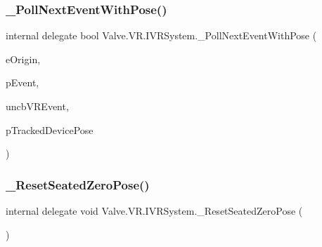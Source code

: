 \mbox{\label{struct_valve_1_1_v_r_1_1_i_v_r_system_a651836066c8780d5e5aadab482bd22d3}} 
\subsubsection{\texorpdfstring{\_PollNextEventWithPose()}{\_PollNextEventWithPose()}}
{\footnotesize\ttfamily internal delegate bool Valve.\+V\+R.\+I\+V\+R\+System.\+\_\+\+Poll\+Next\+Event\+With\+Pose (\begin{DoxyParamCaption}\item[{\mbox{\hyperlink{namespace_valve_1_1_v_r_a29be99a3c2f780157bd490db06a7f12f}{E\+Tracking\+Universe\+Origin}}}]{e\+Origin,  }\item[{ref \mbox{\hyperlink{struct_valve_1_1_v_r_1_1_v_r_event__t}{V\+R\+Event\+\_\+t}}}]{p\+Event,  }\item[{uint}]{uncb\+V\+R\+Event,  }\item[{ref \mbox{\hyperlink{struct_valve_1_1_v_r_1_1_tracked_device_pose__t}{Tracked\+Device\+Pose\+\_\+t}}}]{p\+Tracked\+Device\+Pose }\end{DoxyParamCaption})}

\mbox{\label{struct_valve_1_1_v_r_1_1_i_v_r_system_ae73e4e8327964bc0c9947bebed6f41fd}} 
\subsubsection{\texorpdfstring{\_ResetSeatedZeroPose()}{\_ResetSeatedZeroPose()}}
{\footnotesize\ttfamily internal delegate void Valve.\+V\+R.\+I\+V\+R\+System.\+\_\+\+Reset\+Seated\+Zero\+Pose (\begin{DoxyParamCaption}{ }\end{DoxyParamCaption})}

\mbox{\label{struct_valve_1_1_v_r_1_1_i_v_r_system_a97b502df669ebd8f271bea132cd15eed}} 
